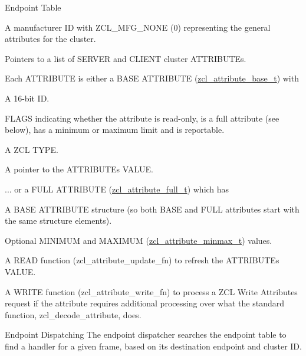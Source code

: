 \begin{DoxyParagraph}{Endpoint Table}
\begin{DoxyItemize}
\begin{DoxyItemize}
\item A manufacturer ID with Z\+C\+L\+\_\+\+M\+F\+G\+\_\+\+N\+O\+NE (0) representing the general attributes for the cluster.
\item Pointers to a list of S\+E\+R\+V\+ER and C\+L\+I\+E\+NT cluster A\+T\+T\+R\+I\+B\+U\+T\+Es.
\end{DoxyItemize}
\item Each A\+T\+T\+R\+I\+B\+U\+TE is either a B\+A\+SE A\+T\+T\+R\+I\+B\+U\+TE (\hyperlink{structzcl__attribute__base__t}{zcl\+\_\+attribute\+\_\+base\+\_\+t}) with
\begin{DoxyItemize}
\item A 16-\/bit ID.
\item F\+L\+A\+GS indicating whether the attribute is read-\/only, is a full attribute (see below), has a minimum or maximum limit and is reportable.
\item A Z\+CL T\+Y\+PE.
\item A pointer to the A\+T\+T\+R\+I\+B\+U\+TE\textquotesingle{}s V\+A\+L\+UE.
\end{DoxyItemize}
\item ... or a F\+U\+LL A\+T\+T\+R\+I\+B\+U\+TE (\hyperlink{structzcl__attribute__full__t}{zcl\+\_\+attribute\+\_\+full\+\_\+t}) which has
\begin{DoxyItemize}
\item A B\+A\+SE A\+T\+T\+R\+I\+B\+U\+TE structure (so both B\+A\+SE and F\+U\+LL attributes start with the same structure elements).
\item Optional M\+I\+N\+I\+M\+UM and M\+A\+X\+I\+M\+UM (\hyperlink{unionzcl__attribute__minmax__t}{zcl\+\_\+attribute\+\_\+minmax\+\_\+t}) values.
\item A R\+E\+AD function (zcl\+\_\+attribute\+\_\+update\+\_\+fn) to refresh the A\+T\+T\+R\+I\+B\+U\+TE\textquotesingle{}s V\+A\+L\+UE.
\item A W\+R\+I\+TE function (zcl\+\_\+attribute\+\_\+write\+\_\+fn) to process a Z\+CL Write Attributes request if the attribute requires additional processing over what the standard function, zcl\+\_\+decode\+\_\+attribute, does.
\end{DoxyItemize}
\end{DoxyItemize}
\end{DoxyParagraph}
\begin{DoxyParagraph}{Endpoint Dispatching}
The endpoint dispatcher searches the endpoint table to find a handler for a given frame, based on its destination endpoint and cluster ID.
\end{DoxyParagraph}
